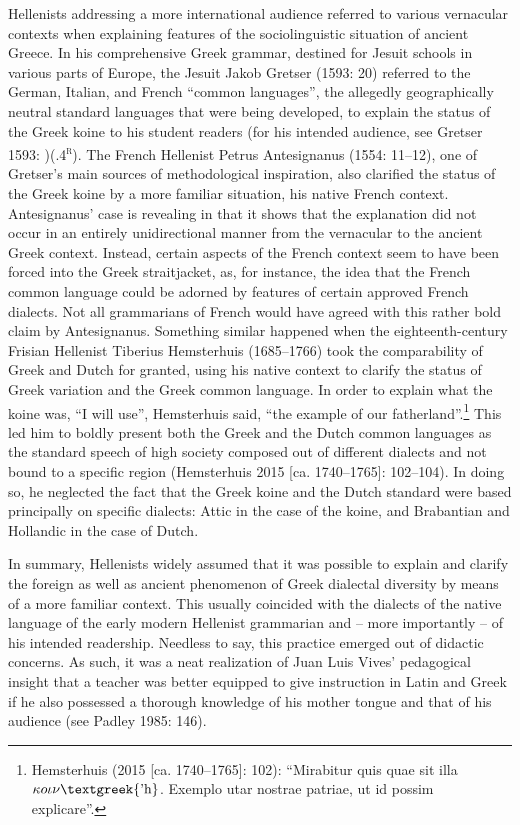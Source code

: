 \begin{styleStandard}
Hellenists addressing a more international audience referred to various vernacular contexts when explaining features of the sociolinguistic situation of ancient Greece. In his comprehensive Greek grammar, destined for Jesuit schools in various parts of Europe, the Jesuit Jakob Gretser (1593: 20) referred to the German, Italian, and French “common languages”, the allegedly geographically neutral standard languages that were being developed, to explain the status of the Greek koine to his student readers (for his intended audience, see Gretser 1593: )(.4\textsc{\textsuperscript{r}}). The French Hellenist Petrus Antesignanus (1554: 11–12), one of Gretser’s main sources of methodological inspiration, also clarified the status of the Greek koine by a more familiar situation, his native French context. Antesignanus’ case is revealing in that it shows that the explanation did not occur in an entirely unidirectional manner from the vernacular to the ancient Greek context. Instead, certain aspects of the French context seem to have been forced into the Greek straitjacket, as, for instance, the idea that the French common language could be adorned by features of certain approved French dialects. Not all grammarians of French would have agreed with this rather bold claim by Antesignanus. Something similar happened when the eighteenth-century Frisian Hellenist Tiberius Hemsterhuis (1685–1766) took the comparability of Greek and Dutch for granted, using his native context to clarify the status of Greek variation and the Greek common language. In order to explain what the koine was, “I will use”, Hemsterhuis said, “the example of our fatherland”.\footnote{ Hemsterhuis (2015 [ca. 1740–1765]: 102): “Mirabitur quis quae sit illa $\kappa o\iota \nu \text{\textgreek{'h}}$. Exemplo utar nostrae patriae, ut id possim explicare”.} This led him to boldly present both the Greek and the Dutch common languages as the standard speech of high society composed out of different dialects and not bound to a specific region (Hemsterhuis 2015 [ca. 1740–1765]: 102–104). In doing so, he neglected the fact that the Greek koine and the Dutch standard were based principally on specific dialects: Attic in the case of the koine, and Brabantian and Hollandic in the case of Dutch.
\end{styleStandard}

\begin{styleStandard}
In summary, Hellenists widely assumed that it was possible to explain and clarify the foreign as well as ancient phenomenon of Greek dialectal diversity by means of a more familiar context. This usually coincided with the dialects of the native language of the early modern Hellenist grammarian and – more importantly – of his intended readership. Needless to say, this practice emerged out of didactic concerns. As such, it was a neat realization of Juan Luis Vives’ pedagogical insight that a teacher was better equipped to give instruction in Latin and Greek if he also possessed a thorough knowledge of his mother tongue and that of his audience (see Padley 1985: 146).
\end{styleStandard}

